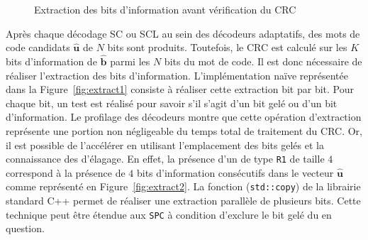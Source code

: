 \begin{figure}[t]
  \centering
  \quad
  \caption{Extraction des bits d'information avant vérification du CRC}
  \label{fig:extract}
\end{figure}

Après chaque décodage SC ou SCL au sein des décodeurs adaptatifs, des mots de code candidats $\mathbold{\hat{u}}$ de $N$ bits sont produits.
Toutefois, le CRC est calculé sur les $K$ bits d'information de $\mathbold{\hat{b}}$ parmi les $N$ bits du mot de code.
Il est donc nécessaire de réaliser l'extraction des bits d'information.
L'implémentation naïve représentée dans la Figure~\ref{fig:extract1} consiste à réaliser cette extraction bit par bit.
Pour chaque bit, un test est réalisé pour savoir s'il s'agit d'un bit gelé ou d'un bit d'information.
Le profilage des décodeurs montre que cette opération d'extraction représente une portion non négligeable du temps total de traitement du CRC.
Or, il est possible de l'accélérer en utilisant l'emplacement des bits gelés et la connaissance des \noeuds d'élagage.
En effet, la présence d'un \noeud de type \texttt{R1} de taille $4$ correspond à la présence de $4$ bits d'information consécutifs dans le vecteur $\mathbold{\hat{u}}$ comme représenté en Figure~\ref{fig:extract2}.
La fonction (\texttt{std::copy}) de la librairie standard C++ permet de réaliser une extraction parallèle de plusieurs bits.
Cette technique peut être étendue aux \noeuds \texttt{SPC} à condition d'exclure le bit gelé du \noeud en question.

